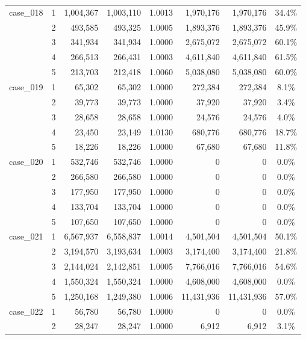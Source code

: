 \begin{footnotesize}
\begin{longtable}{l c rr c rr c}
\addlinespace[2pt]
case\_018 & 1 & 1{,}004{,}367 & 1{,}003{,}110 & 1.0013 & 1{,}970{,}176 & 1{,}970{,}176 & 34.4\% \\
 & 2 & 493{,}585 & 493{,}325 & 1.0005 & 1{,}893{,}376 & 1{,}893{,}376 & 45.9\% \\
 & 3 & 341{,}934 & 341{,}934 & 1.0000 & 2{,}675{,}072 & 2{,}675{,}072 & 60.1\% \\
 & 4 & 266{,}513 & 266{,}431 & 1.0003 & 4{,}611{,}840 & 4{,}611{,}840 & 61.5\% \\
 & 5 & 213{,}703 & 212{,}418 & 1.0060 & 5{,}038{,}080 & 5{,}038{,}080 & 60.0\% \\
\addlinespace[2pt]
case\_019 & 1 & 65{,}302 & 65{,}302 & 1.0000 & 272{,}384 & 272{,}384 & 8.1\% \\
 & 2 & 39{,}773 & 39{,}773 & 1.0000 & 37{,}920 & 37{,}920 & 3.4\% \\
 & 3 & 28{,}658 & 28{,}658 & 1.0000 & 24{,}576 & 24{,}576 & 4.0\% \\
 & 4 & 23{,}450 & 23{,}149 & 1.0130 & 680{,}776 & 680{,}776 & 18.7\% \\
 & 5 & 18{,}226 & 18{,}226 & 1.0000 & 67{,}680 & 67{,}680 & 11.8\% \\
\addlinespace[2pt]
case\_020 & 1 & 532{,}746 & 532{,}746 & 1.0000 & 0 & 0 & 0.0\% \\
 & 2 & 266{,}580 & 266{,}580 & 1.0000 & 0 & 0 & 0.0\% \\
 & 3 & 177{,}950 & 177{,}950 & 1.0000 & 0 & 0 & 0.0\% \\
 & 4 & 133{,}704 & 133{,}704 & 1.0000 & 0 & 0 & 0.0\% \\
 & 5 & 107{,}650 & 107{,}650 & 1.0000 & 0 & 0 & 0.0\% \\
\addlinespace[2pt]
case\_021 & 1 & 6{,}567{,}937 & 6{,}558{,}837 & 1.0014 & 4{,}501{,}504 & 4{,}501{,}504 & 50.1\% \\
 & 2 & 3{,}194{,}570 & 3{,}193{,}634 & 1.0003 & 3{,}174{,}400 & 3{,}174{,}400 & 21.8\% \\
 & 3 & 2{,}144{,}024 & 2{,}142{,}851 & 1.0005 & 7{,}766{,}016 & 7{,}766{,}016 & 54.6\% \\
 & 4 & 1{,}550{,}324 & 1{,}550{,}324 & 1.0000 & 4{,}608{,}000 & 4{,}608{,}000 & 0.0\% \\
 & 5 & 1{,}250{,}168 & 1{,}249{,}380 & 1.0006 & 11{,}431{,}936 & 11{,}431{,}936 & 57.0\% \\
\addlinespace[2pt]
case\_022 & 1 & 56{,}780 & 56{,}780 & 1.0000 & 0 & 0 & 0.0\% \\
 & 2 & 28{,}247 & 28{,}247 & 1.0000 & 6{,}912 & 6{,}912 & 3.1\% \\

\end{longtable}
\end{footnotesize}
